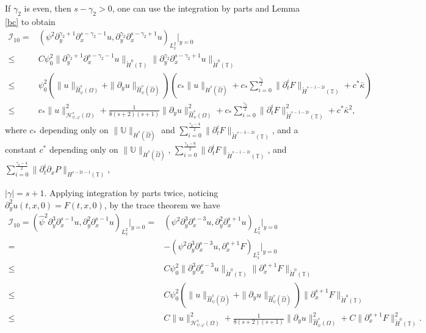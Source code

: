 \documentclass{amsart}
\numberwithin{equation}{section}
\begin{document}
If $\gamma_{2}$ is even, then $s-\gamma_{2}>0$, one can use the integration by parts and Lemma \ref{bc} to obtain
\begin{align*}
\mathcal{I}_{10}
=&(\psi^{2}\partial_{y}^{\gamma_{2}+1}\partial_{x}^{s-\gamma_{2}-1}u, \partial_{y}^{\gamma_{2}}\partial_{x}^{s-\gamma_{2}+1}u)_{L_{x}^{2}}|_{y=0}\\
\leq& C\psi_{0}^{2}\|\partial_{y}^{\gamma_{2}+1}\partial_{x}^{s-\gamma_{2}-1}u\|_{\mathring{H}^{0}(\mathbb{T})}
       \|\partial_{y}^{\gamma_{2}}\partial_{x}^{s-\gamma_{2}+1}u\|_{\mathring{H}^{0}(\mathbb{T})}\\
\leq& \psi_{0}^{2}\left(\|u\|_{\hat{H}_{\psi}^{s}(\Omega)}+\|\partial_{y}u\|_{\hat{H}_{\psi}^{s}(\hat{\Omega})}\right)
       \left(c_{*}\|u\|_{\ddot{H}^{s}(\hat{\Omega})}
     +c_{*}\sum_{i=0}^{\frac{\gamma_{2}}{2}}\|\partial_{t}^{i}F\|_{\mathring{H}^{s-1-2i}(\mathbb{T})}
     +c^{*}\bar{\kappa}\right)\\
\leq& c_{*}\|u\|_{\mathcal{H}_{\psi,\varphi}^{s}(\Omega)}^{2}
     +\frac{1}{8(s+2)(s+1)}\|\partial_{y}u\|_{\hat{H}_{\psi}^{s}(\Omega)}^{2}
     +c_{*}\sum_{i=0}^{\frac{\gamma_{2}}{2}}\|\partial_{t}^{i}F\|_{\mathring{H}^{s-1-2i}(\mathbb{T})}^{2}
     +c^{*}\bar{\kappa}^{2},
\end{align*}
where $c_{*}$ depending only on $\|\mathbb{U}\|_{\ddot{H}^{s}(\hat{\Omega})}$ and
$\sum\limits_{i=0}^{\frac{\gamma_{2}-4}{2}}\|\partial_{t}^{i}F\|_{\mathring{H}^{s-3-2i}(\mathbb{T})}$,
and a constant  $c^{*}$ depending only on $\|\mathbb{U}\|_{\ddot{H}^{s}(\hat{\Omega})}$,
$\sum\limits_{i=0}^{\frac{\gamma_{2}-6}{2}}\|\partial_{t}^{i}F\|_{\mathring{H}^{s-1-2i}(\mathbb{T})}$,
and $\sum\limits_{i=0}^{\frac{\gamma_{2}-4}{2}}\|\partial_{t}^{i}\partial_{x}P\|_{H^{s-2i-1}(\mathbb{T})}$,

 $|\gamma|=s+1$. Applying integration by parts twice, noticing $\partial_{y}^{2}u(t,x,0)=F(t,x,0)$, by the trace theorem we have
\begin{align*}
\mathcal{I}_{10}
=(\hat{\psi}^{2}\partial_{y}^{3}\partial_{x}^{s-1}u, \partial_{y}^{2}\partial_{x}^{s-1}u)_{L_{x}^{2}}|_{y=0}
=& (\psi^{2}\partial_{y}^{3}\partial_{x}^{s-3}u, \partial_{y}^{2}\partial_{x}^{s+1}u)_{L_{x}^{2}}|_{y=0}\\
=&-(\psi^{2}\partial_{y}^{3}\partial_{x}^{s-3}u, \partial_{x}^{s+1}F)_{L_{x}^{2}}|_{y=0}\\
\leq& C\psi_{0}^{2}\|\partial_{y}^{3}\partial_{x}^{s-3}u\|_{\mathring{H}^{0}(\mathbb{T})}
       \|\partial_{x}^{s+1}F\|_{\mathring{H}^{0}(\mathbb{T})}\\
\leq& C\psi_{0}^{2}\left(\|u\|_{\hat{H}_{\psi}^{s}(\hat{\Omega})}+\|\partial_{y}u\|_{\hat{H}_{\psi}^{s}(\hat{\Omega})}\right)
       \|\partial_{x}^{s+1}F\|_{\mathring{H}^{0}(\mathbb{T})}\\
\leq& C\|u\|_{\mathcal{H}_{\psi,\varphi}^{s}(\Omega)}^{2}
     +\frac{1}{8(s+2)(s+1)}\|\partial_{y}u\|_{\hat{H}_{\psi}^{s}(\Omega)}^{2}
     +C\|\partial_{x}^{s+1}F\|_{\mathring{H}^{0}(\mathbb{T})}^{2}.
\end{align*}
\end{document}

